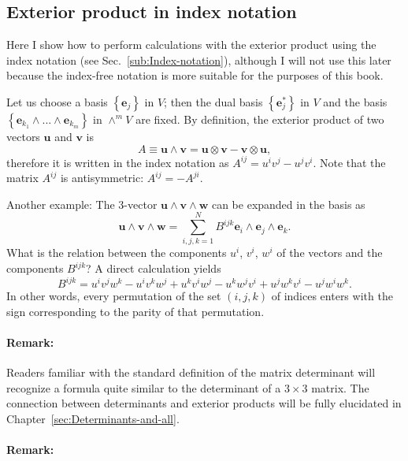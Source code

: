 \subsection{Exterior product in index notation\label{sub:Exterior-product-in-index}}

Here I show how to perform calculations with the exterior product
using the index notation
(see Sec.~\ref{sub:Index-notation}), although I will not use this
later because the index-free notation is more suitable for the purposes
of this book. 

Let us choose a basis $\left\{ \mathbf{e}_{j}\right\} $ in $V$;
then the dual basis $\left\{ \mathbf{e}_{j}^{*}\right\} $ in $V$
and the basis $\left\{ \mathbf{e}_{k_{1}}\wedge...\wedge\mathbf{e}_{k_{m}}\right\} $
in $\wedge^{m}V$ are fixed. By definition, the exterior product of
two vectors $\mathbf{u}$ and $\mathbf{v}$ is \[
A\equiv\mathbf{u}\wedge\mathbf{v}=\mathbf{u}\otimes\mathbf{v}-\mathbf{v}\otimes\mathbf{u},\]
 therefore it is written in the index notation as $A^{ij}=u^{i}v^{j}-u^{j}v^{i}$.
Note that the matrix $A^{ij}$ is antisymmetric: $A^{ij}=-A^{ji}$.

Another example: The 3-vector $\mathbf{u}\wedge\mathbf{v}\wedge\mathbf{w}$
can be expanded in the basis as\[
\mathbf{u}\wedge\mathbf{v}\wedge\mathbf{w}=\sum_{i,j,k=1}^{N}B^{ijk}\mathbf{e}_{i}\wedge\mathbf{e}_{j}\wedge\mathbf{e}_{k}.\]
What is the relation between the components $u^{i}$, $v^{i}$, $w^{i}$
of the vectors and the components $B^{ijk}$? A direct calculation
yields\begin{equation}
B^{ijk}=u^{i}v^{j}w^{k}-u^{i}v^{k}w^{j}+u^{k}v^{i}w^{j}-u^{k}w^{j}v^{i}+u^{j}w^{k}v^{i}-u^{j}w^{i}w^{k}.\label{eq:Bijk formula}\end{equation}
In other words, every permutation of the set $\left(i,j,k\right)$
of indices enters with the sign corresponding to the parity of that
permutation. 


\paragraph{Remark:}

Readers familiar with the standard definition of the matrix determinant
will recognize a formula quite similar to the determinant of a $3\times3$
matrix. The connection between determinants and exterior products
will be fully elucidated in Chapter~\ref{sec:Determinants-and-all}.


\paragraph{Remark:}

